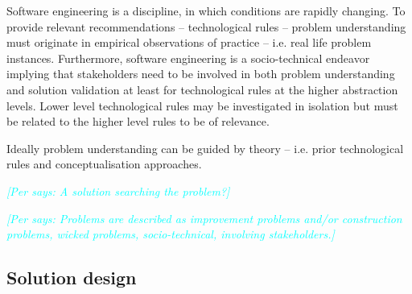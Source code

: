 \documentclass[graybox]{svmult}
\newcommand{\per}[1]{\textcolor{cyan}{{\it [Per says: #1]}}}
\newcommand{\per}[1]{}
\begin{document}
Software engineering is a discipline, in which conditions are rapidly changing. To provide relevant recommendations -- technological rules -- problem understanding must originate in empirical observations of practice -- i.e. real life problem instances. Furthermore, software engineering is a socio-technical endeavor implying that stakeholders need to be involved in both problem understanding and solution validation at least for technological rules at the higher abstraction levels. Lower level technological rules may be investigated in isolation but must be related to the higher level rules to be of relevance. 


Ideally problem understanding can be guided by theory -- i.e. prior technological rules and conceptualisation approaches. 



\per{A solution searching the problem?}

\per{Problems are described as improvement problems and/or construction problems, wicked problems, socio-technical, involving stakeholders.} 



\subsection{Solution design}
\end{document}
